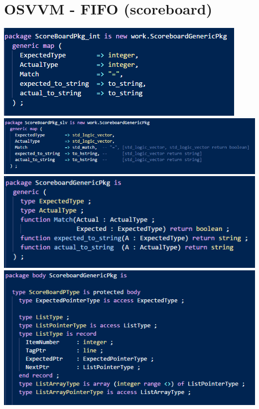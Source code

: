 \documentclass{article}
\begin{document}

\section{OSVVM - FIFO (scoreboard)}
\includegraphics[scale=0.8]{sb_int}\\
\includegraphics[scale=0.8]{sb_slv}\\
\includegraphics[scale=0.8]{sb_generic}\\
\includegraphics[scale=0.8]{sb_body}\\
\end{document}
